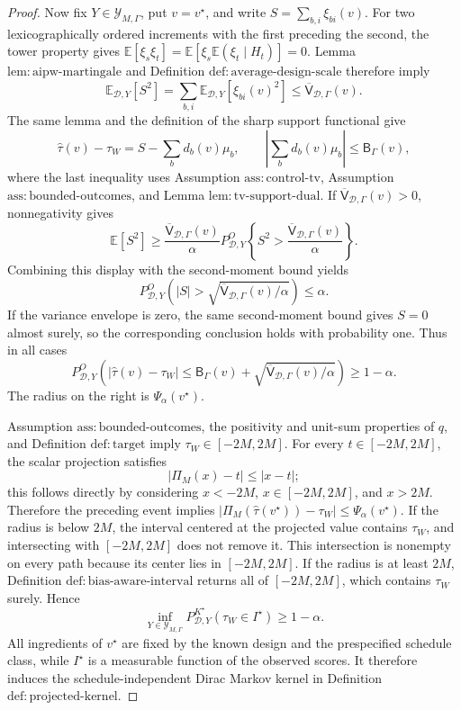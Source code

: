 \documentclass{article}
\begin{document}
\begin{proof}
Now fix \(Y\in\mathcal Y_{M,\Gamma}\), put \(v=v^\star\), and write \(S=\sum_{b,i}\xi_{bi}(v)\).  For two lexicographically ordered increments with the first preceding the second, the tower property gives \(\mathbb E[\xi_s\xi_t]=\mathbb E[\xi_s\mathbb E(\xi_t\mid H_t)]=0\).  Lemma \(\mathrm{lem:aipw\text{-}martingale}\) and Definition \(\mathrm{def:average\text{-}design\text{-}scale}\) therefore imply
\[
\mathbb E_{\mathcal D,Y}[S^2]
=\sum_{b,i}\mathbb E_{\mathcal D,Y}[\xi_{bi}(v)^2]
\le\overline{\mathsf V}_{\mathcal D,\Gamma}(v).
\]
The same lemma and the definition of the sharp support functional give
\[
\widehat\tau(v)-\tau_W
=S-\sum_bd_b(v)\mu_b,
\qquad
\left|\sum_bd_b(v)\mu_b\right|\le\mathsf B_\Gamma(v),
\]
where the last inequality uses Assumption \(\mathrm{ass:control\text{-}tv}\), Assumption \(\mathrm{ass:bounded\text{-}outcomes}\), and Lemma \(\mathrm{lem:tv\text{-}support\text{-}dual}\).  If \(\overline{\mathsf V}_{\mathcal D,\Gamma}(v)>0\), nonnegativity gives
\[
\mathbb E[S^2]\ge
\frac{\overline{\mathsf V}_{\mathcal D,\Gamma}(v)}{\alpha}
P^O_{\mathcal D,Y}\left\{
S^2>\frac{\overline{\mathsf V}_{\mathcal D,\Gamma}(v)}{\alpha}
\right\}.
\]
Combining this display with the second-moment bound yields
\[
P^O_{\mathcal D,Y}\left(
 |S|>\sqrt{\overline{\mathsf V}_{\mathcal D,\Gamma}(v)/\alpha}
\right)\le\alpha.
\]
If the variance envelope is zero, the same second-moment bound gives \(S=0\) almost surely, so the corresponding conclusion holds with probability one.  Thus in all cases
\[
P^O_{\mathcal D,Y}\left(
 |\widehat\tau(v)-\tau_W|\le
 \mathsf B_\Gamma(v)+
 \sqrt{\overline{\mathsf V}_{\mathcal D,\Gamma}(v)/\alpha}
\right)\ge1-\alpha.
\]
The radius on the right is \(\Psi_\alpha(v^\star)\).

Assumption \(\mathrm{ass:bounded\text{-}outcomes}\), the positivity and unit-sum properties of \(q\), and Definition \(\mathrm{def:target}\) imply \(\tau_W\in[-2M,2M]\).  For every \(t\in[-2M,2M]\), the scalar projection satisfies
\[
|\Pi_M(x)-t|\le|x-t|;
\]
this follows directly by considering \(x<-2M\), \(x\in[-2M,2M]\), and \(x>2M\).  Therefore the preceding event implies
\(|\Pi_M(\widehat\tau(v^\star))-\tau_W|\le\Psi_\alpha(v^\star)\).  If the radius is below \(2M\), the interval centered at the projected value contains \(\tau_W\), and intersecting with \([-2M,2M]\) does not remove it.  This intersection is nonempty on every path because its center lies in \([-2M,2M]\).  If the radius is at least \(2M\), Definition \(\mathrm{def:bias\text{-}aware\text{-}interval}\) returns all of \([-2M,2M]\), which contains \(\tau_W\) surely.  Hence
\[
\inf_{Y\in\mathcal Y_{M,\Gamma}}
P^{K^\star}_{\mathcal D,Y}(\tau_W\in I^\star)\ge1-\alpha.
\]
All ingredients of \(v^\star\) are fixed by the known design and the prespecified schedule class, while \(I^\star\) is a measurable function of the observed scores.  It therefore induces the schedule-independent Dirac Markov kernel in Definition \(\mathrm{def:projected\text{-}kernel}\).


\end{proof}
\end{document}
